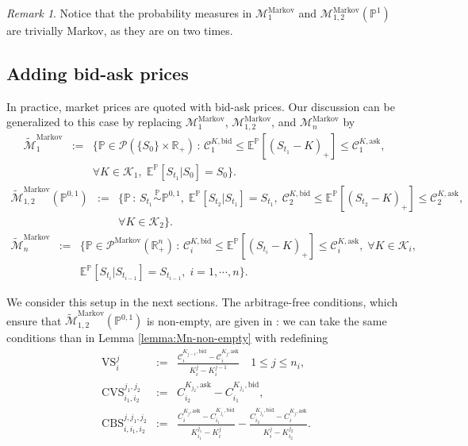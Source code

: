 \documentclass{amsart}%
\def\b*{\begin{eqnarray*}}
\def\e*{\end{eqnarray*}}
\def \P{{\mathbb P}}
\def \R{\mathbb{R}}
\def\Cc{{\cal C}}
\def\Pc{{\cal P}}
\def\no{\noindent}
\def\x{\times}
\theoremstyle{definition}
\theoremstyle{remark}
\newtheorem{rem}[thm]{Remark}
\newcommand{\PP}{\mathbb{P}}
\newcommand{\beaa}{\begin{eqnarray*}}
\newcommand{\eeaa}{\end{eqnarray*}}
\newcommand{\EE}{{\mathbb E}}
\newcommand{\cal}{\mathcal}
\begin{document}
 \begin{rem}
 Notice that the probability measures in ${\cal M}^\mathrm{Markov}_1$ and $ {\cal M}^\mathrm{Markov}_{1,2}(\P^1)$ are trivially Markov, as they are on two times.
 \end{rem}

 \subsection{Adding bid-ask prices} In practice, market prices are quoted with bid-ask prices.  Our discussion can be generalized to this case by replacing $ {\cal M}^\mathrm{Markov}_1$, ${\cal M}^\mathrm{Markov}_{1,2}$, and ${\cal M}^\mathrm{Markov}_n$ by
\beaa
\widetilde{\cal M}^\mathrm{Markov}_1&:=&\{\PP\in\Pc(\{S_0\}\x\R_+) \, : \,   \Cc^{K,\mathrm{bid}}_1 \leq \EE^\PP[(S_{t_1}-K)_+] \leq \Cc^{K,\mathrm{ask}}_1, \;\\
&&\forall K \in {\cal K}_1,  \;
\EE^\PP[S_{t_1}|S_0]=S_{0} \}.
\eeaa 
\beaa 
\widetilde{\cal M}^\mathrm{Markov}_{1,2}(\PP^{0,1})&:=&\{\PP \, : \, S_{t_1} \overset{\PP}{\sim} \PP^{0,1},\; \EE^\PP[S_{t_2}|S_{t_1}]=S_{t_1}, \; \Cc^{K,\mathrm{bid}}_2 \leq \EE^\PP[(S_{t_{2}}-K)_+] \leq \Cc^{K,\mathrm{ask}}_2, \;\\
&&\forall K \in {\cal K}_2  \}.
\eeaa 
\beaa 
\widetilde{\cal M}^\mathrm{Markov}_n&:=&\{\PP\in\Pc^\mathrm{Markov} (\R^n_+)\,:\,  \Cc^{K,\mathrm{bid}}_i \leq \EE^\PP[(S_{t_{i}}-K)_+] \leq \Cc^{K,\mathrm{ask}}_i, \; \forall K \in {\cal K}_i,  \;\\
&&\EE^\PP[S_{t_i}|S_{t_{i-1}}]=S_{t_{i-1}}, \; i=1, \cdots ,n \}.
\eeaa 



\no We consider this setup in the next sections. The arbitrage-free conditions, which ensure that  $\widetilde{\cal M}^\mathrm{Markov}_{1,2}(\PP^{0,1})$ is non-empty, are given in \cite{cousot2007conditions}: we can take the same conditions than in Lemma \ref{lemma:Mn-non-empty} with redefining
\b*
\mathrm{VS}_i^j &:=& \frac{ {\cal C}_i^{K_{j-1},\mathrm{bid}}-{\cal C}_i^{K_j,\mathrm{ask}} }{K_i^j -K^{j-1}_i } \quad 1 \leq j \leq n_i, \\
\mathrm{CVS}_ {i_1,i_2}^{j_1,j_2}&:=& C_{i_2}^{K_{j_2},\mathrm{ask}}- C_{i_1}^{K_{j_1},\mathrm{bid}}, \\
\mathrm{CBS}_ {i,i_1,i_2}^{j,j_1,j_2}&:=&\frac{C_{i}^{K_{j},\mathrm{ask}}- C_{i_1}^{K_{j_1},\mathrm{bid}}
}{K_{i_1}^{j_1} -K_{i}^j }-\frac{ C_{i_2}^{K_{j_2},\mathrm{bid}}- C_{i}^{K_{j},\mathrm{ask}}
}{K_{i}^j -K_{i_2}^{j_2}  }.
\e*
\end{document}
